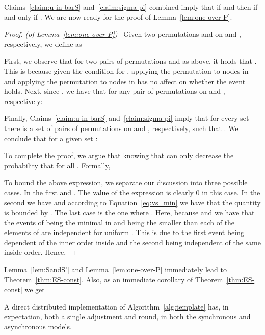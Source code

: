 Claims~\ref{claim:u-in-barS} and~\ref{claim:sigma-pi} combined imply that if  and  then  if and only if . We are now ready for the proof of Lemma~\ref{lem:one-over-P}.
\begin{proof}
\emph{(of Lemma~\ref{lem:one-over-P})~}
Given two permutations  and  on  and , respectively, we define  as 




First, we observe that for two pairs of permutations  and  as above, it holds that . This is because given the condition for , applying the permutation  to nodes in  and applying the permutation  to nodes in  has no affect on whether the event  holds.
Next, since , we have that for any pair of permutations  on  and , respectively:
\vspace{-0.1in}


Finally, Claims~\ref{claim:u-in-barS} and~\ref{claim:sigma-pi} imply that for every set  there is a set of  pairs of permutations  on  and , respectively, such that . We conclude that for a given set :
\vspace{-0.2in}

\vspace{-0.25in}

To complete the proof, we argue that knowing that  can only decrease the probability that  for all . Formally,

To bound the above expression, we separate our discussion into three possible cases. In the first  and . The value of the expression is clearly 0 in this case. In the second we have  and according to Equation~\eqref{eq:vs_min} we have that the quantity is bounded by . The last case is the one where . Here, because  and  we have that the events of  being the minimal in  and  being the smaller than each of the elements of  are independent for uniform . This is due to the first event being dependent of the inner order inside  and the second being independent of the same inside order.
Hence,

\vspace{-0.2in}

\end{proof}
\vspace{-0.1in}

Lemma~\ref{lem:SandS'} and Lemma~\ref{lem:one-over-P} immediately lead to Theorem~\ref{thm:ES-const}. Also, as an immediate corollary of Theorem~\ref{thm:ES-const} we get

\begin{corollary}
A direct distributed implementation of Algorithm~\ref{alg:template} has, in expectation, both a single adjustment and round, in both the synchronous and asynchronous models.
\end{corollary}

